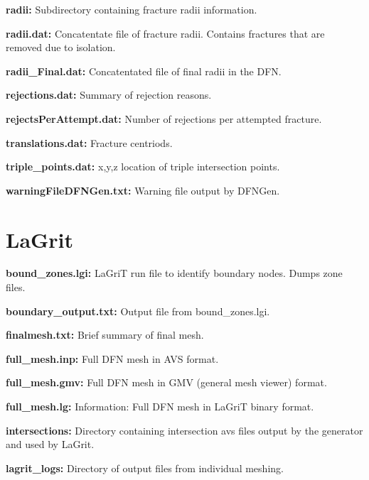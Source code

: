 \documentclass[letterpaper,10pt,english]{sphinxmanual}
\begin{document}
\textbf{radii:}
\label{output:radii}
Subdirectory containing fracture radii information.

\textbf{radii.dat:}
\label{output:radii-dat}
Concatentate file of fracture radii. Contains fractures that are removed due to isolation.

\textbf{radii\_Final.dat:}
\label{output:radii-final-dat}
Concatentated file of final radii in the DFN.

\textbf{rejections.dat:}
\label{output:rejections-dat}
Summary of rejection reasons.

\textbf{rejectsPerAttempt.dat:}
\label{output:rejectsperattempt-dat}
Number of rejections per attempted fracture.

\textbf{translations.dat:}
\label{output:translations-dat}
Fracture centriods.

\textbf{triple\_points.dat:}
\label{output:triple-points-dat}
x,y,z location of triple intersection points.

\textbf{warningFileDFNGen.txt:}
\label{output:warningfiledfngen-txt}
Warning file output by DFNGen.


\section{LaGrit}
\label{output:id2}
\textbf{bound\_zones.lgi:}
\label{output:bound-zones-lgi}
LaGriT run file to identify boundary nodes. Dumps zone files.

\textbf{boundary\_output.txt:}
\label{output:boundary-output-txt}
Output file from bound\_zones.lgi.

\textbf{finalmesh.txt:}
\label{output:finalmesh-txt}
Brief summary of final mesh.

\textbf{full\_mesh.inp:}
\label{output:full-mesh-inp}
Full DFN mesh in AVS format.

\textbf{full\_mesh.gmv:}
\label{output:full-mesh-gmv}
Full DFN mesh in GMV (general mesh viewer) format.

\textbf{full\_mesh.lg:}
\label{output:full-mesh-lg}
Information: Full DFN mesh in LaGriT binary format.

\textbf{intersections:}
\label{output:intersections}
Directory containing intersection avs files output by the generator and used by LaGrit.

\textbf{lagrit\_logs:}
\label{output:lagrit-logs}
Directory of output files from individual meshing.
\end{document}
